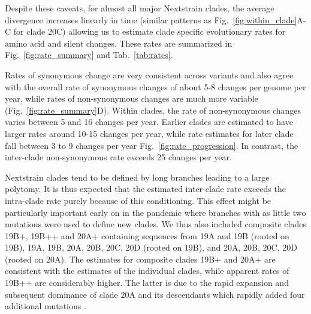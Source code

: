 \documentclass[aps,rmp, twocolumn]{revtex4}
\begin{document}
Despite these caveats, for almost all major Nextstrain clades, the average divergence increases linearly in time (similar patterns as Fig.~\ref{fig:within_clade}A-C for clade 20C) allowing us to estimate clade specific evolutionary rates for amino acid and silent changes.
These rates are summarized in Fig.~\ref{fig:rate_summary} and Tab.~\ref{tab:rates}.

Rates of synonymous change are very consistent across variants and also agree with the overall rate of synonymous changes of about 5-8 changes per genome per year, while rates of non-synonymous changes are much more variable (Fig.~\ref{fig:rate_summary}D).
Within clades, the rate of non-synonymous changes varies between 5 and 16 changes per year.
Earlier clades are estimated to have larger rates around 10-15 changes per year, while rate estimates for later clade fall  between 3 to 9 changes per year Fig.~\ref{fig:rate_progression}.
In contrast, the inter-clade non-synonymous rate exceeds 25 changes per year.

Nextstrain clades tend to be defined by long branches leading to a large polytomy.
It is thus expected that the estimated inter-clade rate exceeds the intra-clade rate purely because of this conditioning.
This effect might be particularly important early on in the pandemic where branches with as little two mutations were used to define new clades.
We thus also included composite clades 19B+, 19B++ and 20A+ containing sequences from 19A and 19B (rooted on 19B), 19A, 19B, 20A, 20B, 20C, 20D (rooted on 19B), and 20A, 20B, 20C, 20D (rooted on 20A).
The estimates for composite clades 19B+ and 20A+ are consistent with the estimates of the individual clades, while apparent rates of 19B++ are considerably higher.
The latter is due to the rapid expansion and subsequent dominance of clade 20A and its descendants which rapidly added four additional mutations \citep{korber_tracking_2020}.
\end{document}
